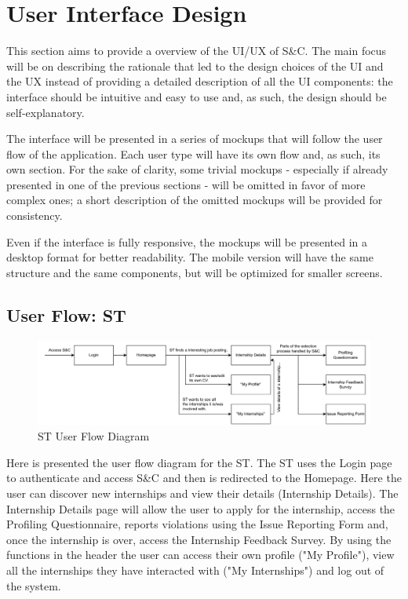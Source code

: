 \chapter{User Interface Design}
\label{chap:user-interface-design}%

\par This section aims to provide a overview of the UI/UX of S\&C. The main focus will be on describing the rationale
that led to the design choices of the UI and the UX instead of providing a detailed description of all the UI
components: the interface should be intuitive and easy to use and, as such, the design should be self-explanatory.

\par The interface will be presented in a series of mockups that will follow the user flow of the application. Each
user type will have its own flow and, as such, its own section. For the sake of clarity, some trivial mockups -
especially if already presented in one of the previous sections - will be omitted in favor of more complex ones; a
short description of the omitted mockups will be provided for consistency.

\par Even if the interface is fully responsive, the mockups will be presented in a desktop format for better
readability. The mobile version will have the same structure and the same components, but will be optimized for
smaller screens.

\section{User Flow: ST}
\label{sec:user-flow-st}%

\begin{figure}[H]
    \centering
    \includegraphics[width=1.0\textwidth]{Images/GUI/ST/Diagram.pdf}
    \caption{ST User Flow Diagram}
    \label{fig:st-user-flow-diagram}
\end{figure}

\par Here is presented the user flow diagram for the ST. The ST uses the Login page to authenticate and access S\&C
and then is redirected to the Homepage. Here the user can discover new internships and view their details
(Internship Details). The Internship Details page will allow the user to apply for the internship, access the
Profiling Questionnaire, reports violations using the Issue Reporting Form and, once the internship is over,
access the Internship Feedback Survey. By using the functions in the header the user can access their own profile
("My Profile"), view all the internships they have interacted with ("My Internships") and log out of the system.

